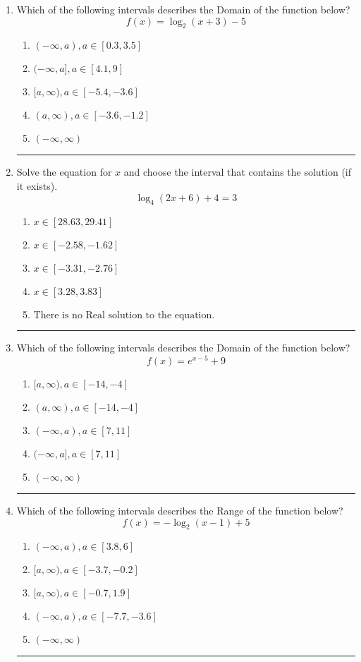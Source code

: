 \documentclass[14pt]{extbook}
\newcommand{\litem}[1]{\item#1\hspace*{-1cm}\rule{\textwidth}{0.4pt}}
\begin{document}
\begin{enumerate}
\litem{
Which of the following intervals describes the Domain of the function below?\[ f(x) = \log_2{(x+3)}-5 \]\begin{enumerate}[label=\Alph*.]
\item \( (-\infty, a), a \in [0.3, 3.5] \)
\item \( (-\infty, a], a \in [4.1, 9] \)
\item \( [a, \infty), a \in [-5.4, -3.6] \)
\item \( (a, \infty), a \in [-3.6, -1.2] \)
\item \( (-\infty, \infty) \)

\end{enumerate} }
\litem{
Solve the equation for $x$ and choose the interval that contains the solution (if it exists).\[ \log_{4}{(2x+6)}+4 = 3 \]\begin{enumerate}[label=\Alph*.]
\item \( x \in [28.63, 29.41] \)
\item \( x \in [-2.58, -1.62] \)
\item \( x \in [-3.31, -2.76] \)
\item \( x \in [3.28, 3.83] \)
\item \( \text{There is no Real solution to the equation.} \)

\end{enumerate} }
\litem{
Which of the following intervals describes the Domain of the function below?\[ f(x) = e^{x-5}+9 \]\begin{enumerate}[label=\Alph*.]
\item \( [a, \infty), a \in [-14, -4] \)
\item \( (a, \infty), a \in [-14, -4] \)
\item \( (-\infty, a), a \in [7, 11] \)
\item \( (-\infty, a], a \in [7, 11] \)
\item \( (-\infty, \infty) \)

\end{enumerate} }
\litem{
Which of the following intervals describes the Range of the function below?\[ f(x) = -\log_2{(x-1)}+5 \]\begin{enumerate}[label=\Alph*.]
\item \( (-\infty, a), a \in [3.8, 6] \)
\item \( [a, \infty), a \in [-3.7, -0.2] \)
\item \( [a, \infty), a \in [-0.7, 1.9] \)
\item \( (-\infty, a), a \in [-7.7, -3.6] \)
\item \( (-\infty, \infty) \)


\end{enumerate}}
\end{enumerate}
\end{document}
